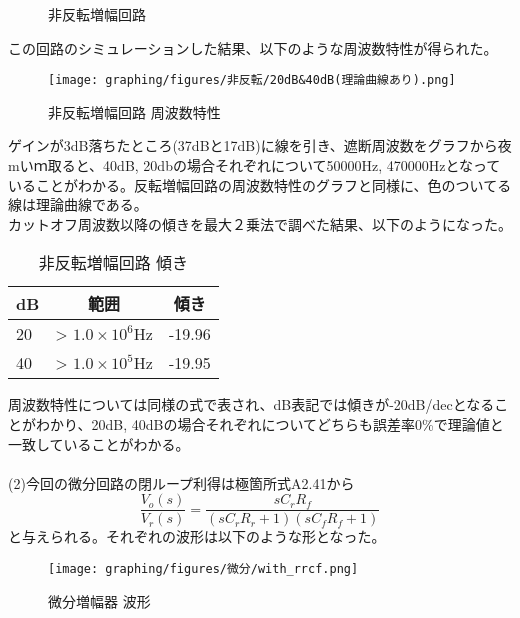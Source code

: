 \documentclass{ltjsarticle}
\begin{document}
\begin{figure}[H]
\begin{center}
\begin{tikzpicture}[circuit ee IEC, scale=0.6666666667,line width=.5pt]
            \end{tikzpicture}

        \caption{非反転増幅回路}
    \end{center}
\end{figure}

この回路のシミュレーションした結果、以下のような周波数特性が得られた。

\begin{figure}[H]
    \begin{center}
        \texttt{[image: graphing/figures/非反転/20dB\&40dB(理論曲線あり).png]}
        \caption{非反転増幅回路 周波数特性}
    \end{center}
\end{figure}

ゲインが3dB落ちたところ(37dBと17dB)に線を引き、遮断周波数をグラフから夜mいｍ取ると、40dB, 20dbの場合それぞれについて50000Hz, 470000Hzとなっていることがわかる。反転増幅回路の周波数特性のグラフと同様に、色のついてる線は理論曲線である。
\\
カットオフ周波数以降の傾きを最大２乗法で調べた結果、以下のようになった。

\begin{table}[H]
    \begin{center}
        \begin{tabular}{|l|c|c|} \hline
            dB & 範囲 & 傾き \\ \hline
            20 & > $1.0\times 10^{6}$Hz & -19.96 \\ \hline
            40 & > $1.0 \times 10^5$Hz & -19.95 \\ \hline
        \end{tabular}
        \caption{非反転増幅回路 傾き}
    \end{center}
\end{table}

周波数特性については同様の式で表され、dB表記では傾きが-20dB/decとなることがわかり、20dB, 40dBの場合それぞれについてどちらも誤差率0\%で理論値と一致していることがわかる。
\\~\\
(2)今回の微分回路の閉ループ利得は極箇所式A2.41から
$$
\frac{V_o(s)}{V_r(s)} = \frac{sC_rR_f}{(sC_rR_r + 1)(sC_fR_f + 1)}
$$
と与えられる。それぞれの波形は以下のような形となった。
\begin{figure}[H]
    \begin{center}
        \texttt{[image: graphing/figures/微分/with\_rrcf.png]}
        \caption{微分増幅器 波形}
    \end{center}
\end{figure}
\end{document}
